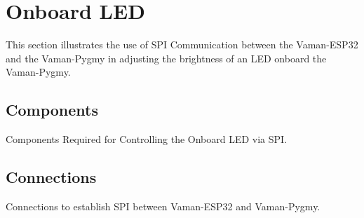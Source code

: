 \section{Onboard LED}
This section illustrates the use of SPI Communication between the Vaman-ESP32
and the Vaman-Pygmy in adjusting the brightness of an LED onboard the 
Vaman-Pygmy.

\subsection{Components}
\begin{table}[!ht]
    \centering
    
    \caption{Components Required for Controlling the Onboard LED via SPI.}
    \label{tab:pwm-led-components}
\end{table}

\subsection{Connections}
\begin{table}[!ht]
    \centering
    
    \caption{Connections to establish SPI between Vaman-ESP32 and Vaman-Pygmy.}
    \label{tab:pwm-led-connections}
\end{table}

